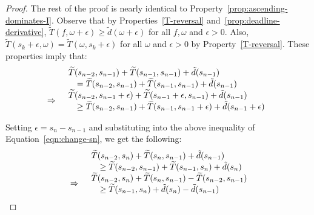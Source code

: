 \begin{proof}
The rest of the proof is nearly identical to Property~\ref{prop:ascending-dominates-I}.
Observe that by Properties~\ref{T-reversal} and~\ref{prop:deadline-derivative}, $\widetilde{T}(f,\omega + \epsilon) \geq \tilde{d}(\omega + \epsilon)$ for all $f, \omega$ and $\epsilon > 0$.  Also, $\widetilde{T}(s_k +\epsilon, \omega) = \widetilde{T}(\omega, s_k+\epsilon)$ for all $\omega$ and $\epsilon >0$ by Property~\ref{T-reversal}.  These properties imply that:
\begin{equation}\label{eqn:change-sn}
\begin{array}{ll}
     & 
     \begin{array}{ll}
        \lefteqn{\widetilde{T}(s_{n-2},s_{n-1}) + \widetilde{T}(s_{n-1}, s_{n-1}) + \tilde{d}(s_{n-1})}& \\
            &= \widetilde{T}(s_{n-2},s_{n-1}) + \widetilde{T}(s_{n-1},s_{n-1}) + \tilde{d}(s_{n-1})
      \end{array}\\
     \Rightarrow & 
     \begin{array}{ll}
        \lefteqn{\widetilde{T}(s_{n-2},s_{n-1} +\epsilon) + \widetilde{T}(s_{n-1}+\epsilon, s_{n-1}) + \tilde{d}(s_{n-1})}& \\
        &\geq \widetilde{T}(s_{n-2},s_{n-1}) + \widetilde{T}(s_{n-1}, s_{n-1} + \epsilon) + \tilde{d}(s_{n-1}+\epsilon) 
    \end{array}\\
\end{array}
\end{equation}

\noindent Setting $\epsilon = s_{n} - s_{n-1}$ and substituting into the above inequality of Equation~\ref{eqn:change-sn}, we get the following:
\begin{equation}\label{eqn:change-sn2}
\begin{array}{ll}
     &\begin{array}{ll}
        \lefteqn{\widetilde{T}(s_{n-2},s_{n}) + \widetilde{T}(s_{n}, s_{n-1}) + \tilde{d}(s_{n-1})}& \\
        &\geq \widetilde{T}(s_{n-2},s_{n-1}) + \widetilde{T}(s_{n-1}, s_{n}) + \tilde{d}(s_{n}) 
    \end{array}\\
    \Rightarrow&
    \begin{array}{ll}
        \lefteqn{\widetilde{T}(s_{n-2},s_{n}) + \widetilde{T}(s_{n}, s_{n-1}) - \widetilde{T}(s_{n-2},s_{n-1})}& \\
        &\geq \widetilde{T}(s_{n-1}, s_{n}) + \tilde{d}(s_{n}) - \tilde{d}(s_{n-1})
    \end{array}\\
\end{array}
\end{equation}


\end{proof}

